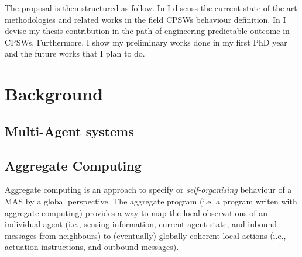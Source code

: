 \documentclass[11pt]{article}
\begin{document}
The proposal is then structured as follow. In  I discuss the current state-of-the-art methodologies and related works in the field CPSWs behaviour definition.
In  I devise my thesis contribution in the path of engineering predictable outcome in CPSWs. Furthermore, I show my preliminary works done in my first PhD year and the future works that I plan to do. 


\section{Background} \label{background}

\subsection{Multi-Agent systems}
\subsection{Aggregate Computing}

Aggregate computing is an approach to specify or \emph{self-organising} behaviour of a MAS by a global perspective.
%
The aggregate program (i.e. a program writen with aggregate computing) provides a way to map the local observations of an individual agent (i.e., sensing information, current agent state, and inbound messages from neighbours) to (eventually) globally-coherent local actions
 (i.e., actuation instructions, and outbound messages).
%
\end{document}
